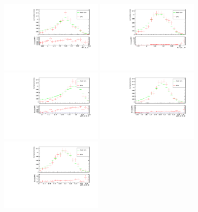 \begin{figure}[h]
\begin{center}
\includegraphics[width=0.45\textwidth]{Figures/Chapter5/BDT_pt_5_7_mc_validation_Bu.pdf}
\includegraphics[width=0.45\textwidth]{Figures/Chapter5/BDT_pt_7_10_mc_validation_Bu.pdf}
\includegraphics[width=0.45\textwidth]{Figures/Chapter5/BDT_pt_10_15_mc_validation_Bu.pdf}
\includegraphics[width=0.45\textwidth]{Figures/Chapter5/BDT_pt_15_20_mc_validation_Bu.pdf}
\includegraphics[width=0.45\textwidth]{Figures/Chapter5/BDT_pt_20_30_mc_validation_Bu.pdf}

\end{center}
\end{figure}
